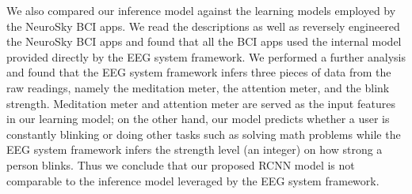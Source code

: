 We also compared our inference model against the learning models employed by the NeuroSky BCI apps. We read the descriptions as well as reversely engineered the NeuroSky BCI apps and found that all the BCI apps used the internal model provided directly by the EEG system framework. We performed a further analysis and found that the EEG system framework infers three pieces of data from the raw readings, namely the meditation meter, the attention meter, and the blink strength. Meditation meter and attention meter are served as the input features in our learning model; on the other hand, our model predicts whether a user is constantly blinking or doing other tasks such as solving math problems while the EEG system framework infers the strength level (an integer) on how strong a person blinks. %
Thus we conclude that our proposed RCNN model is not comparable to the inference model leveraged by the EEG system  framework.

